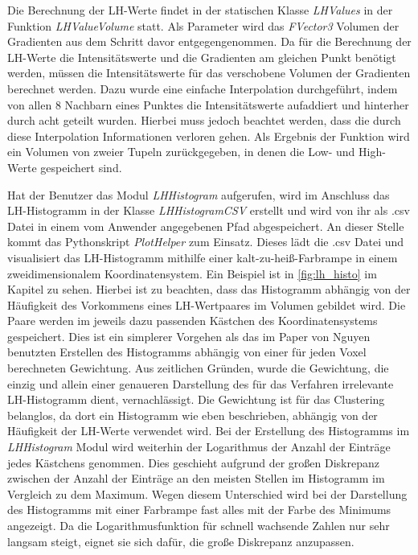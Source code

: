 Die Berechnung der LH-Werte findet in der statischen Klasse \textit{LHValues} in der Funktion \textit{LHValueVolume} statt. Als Parameter wird das \textit{FVector3} Volumen der Gradienten aus dem Schritt davor entgegengenommen.
Da für die Berechnung der LH-Werte die Intensitätswerte und die Gradienten am gleichen Punkt benötigt werden, müssen die Intensitätswerte für das verschobene Volumen der Gradienten berechnet werden. Dazu wurde eine einfache Interpolation durchgeführt, indem von allen 8 Nachbarn eines Punktes die Intensitätswerte aufaddiert und hinterher durch acht geteilt wurden. Hierbei muss jedoch beachtet werden, dass die durch diese Interpolation Informationen verloren gehen.
\newline
Als Ergebnis der Funktion wird ein Volumen von zweier Tupeln zurückgegeben, in denen die Low- und High-Werte gespeichert sind.


Hat der Benutzer das Modul \textit{LHHistogram} aufgerufen, wird im Anschluss das LH-Histogramm in der Klasse \textit{LHHistogramCSV} erstellt und wird von ihr als .csv Datei in einem vom Anwender angegebenen Pfad abgespeichert.
An dieser Stelle kommt das Pythonskript \textit{PlotHelper} zum Einsatz. Dieses lädt die .csv Datei und visualisiert das LH-Histogramm mithilfe einer kalt-zu-heiß-Farbrampe in einem zweidimensionalem Koordinatensystem.
Ein Beispiel ist in \autoref{fig:lh_histo} im Kapitel  zu sehen. Hierbei ist zu beachten, dass das Histogramm abhängig von der Häufigkeit des Vorkommens eines LH-Wertpaares im Volumen gebildet wird. Die Paare werden im jeweils dazu passenden Kästchen des Koordinatensystems gespeichert. Dies ist ein simplerer Vorgehen als das im Paper von Nguyen \cite{nguyen2012clustering} benutzten Erstellen des Histogramms abhängig von einer für jeden Voxel berechneten Gewichtung.
\newline
Aus zeitlichen Gründen, wurde die Gewichtung, die einzig und allein einer genaueren Darstellung des für das Verfahren irrelevante LH-Histogramm dient, vernachlässigt. Die Gewichtung ist für das Clustering belanglos, da dort ein Histogramm wie eben beschrieben, abhängig von der Häufigkeit der LH-Werte verwendet wird.
Bei der Erstellung des Histogramms im \textit{LHHistogram} Modul wird weiterhin der Logarithmus der Anzahl der Einträge jedes Kästchens genommen. Dies geschieht aufgrund der großen Diskrepanz zwischen der Anzahl der Einträge an den meisten Stellen im Histogramm im Vergleich zu dem Maximum. Wegen diesem Unterschied wird bei der Darstellung des Histogramms mit einer Farbrampe fast alles mit der Farbe des Minimums angezeigt. Da die Logarithmusfunktion für schnell wachsende Zahlen nur sehr langsam steigt, eignet sie sich dafür, die große Diskrepanz anzupassen.


